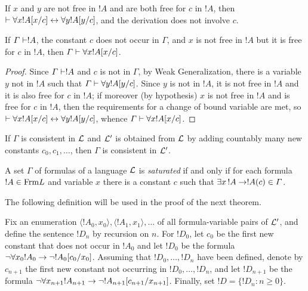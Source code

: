 \documentclass[open-logic-section]{subfiles}
\begin{document}

\begin{prop}
If $x$ and $y$ are not free in $!A$ and are both free for $c$ in $!A$,
then $\Proves \lforall[x] !A[x/c] \liff \lforall[y] !A[y/c]$, and the
derivation does not involve $c$.
\end{prop}

\begin{thm}
If $\Gamma \Proves !A$, the constant $c$ does not occur in $\Gamma$,
and $x$ is not free in $!A$ but it is free for $c$ in $!A$, then
$\Gamma \Proves \lforall[x] !A[x/c]$.
\end{thm}

\begin{proof}
Since $\Gamma \Proves !A$ and $c$ is not in $\Gamma$, by Weak
Generalization, there is a variable $y$ not in $!A$ such that $\Gamma
\Proves \lforall[y] !A [y/c]$.  Since $y$ is not in $!A$, it is not
free in $!A$ and it is also free for $c$ in $!A$; if moreover (by
hypothesis) $x$ is not free in $!A$ and is free for $c$ in $!A$, then
the requirements for a change of bound variable are met, so $\Proves
\lforall[x] !A[x/c] \liff \lforall[y] !A[y/c]$, whence $\Gamma \Proves
\lforall[x] !A[x/c]$.
\end{proof}

\begin{lem}
If $\Gamma$ is consistent in $\mathcal L$ and $\mathcal L'$ is obtained from
$\mathcal L$ by adding countably many new constants $c_0, c_1, \dots$,
then $\Gamma$ is consistent in $\mathcal L'$.
\end{lem}

\begin{defn}
  A set $\Gamma$ of formulas of a language $\mathcal {L}$ is
  \emph{saturated} if and only if for each formula $!A \in
  \Frm {L}$ and variable $x$ there is a constant $c$ such that
  $\lexists[x][!A] \lif !A(c) \in \Gamma$.
\end{defn}


The following definition will be used in the proof of the next theorem.

\begin{defn}
Fix an enumeration $\langle !A_0, x_0 \rangle, \langle !A_1, x_1
\rangle, \dots$ of all formula-variable pairs of $\mathcal L'$, and
define the sentence $!D_n$ by recursion on $n$. For $!D_0$,
let $c_0$ be the first new constant that does not occur in $!A_0$ and
let $!D_0$ be the formula $\lnot \lforall[x_0] !A_0 \lif \lnot
!A_0[c_0/x_0]$. Assuming that $!D_0, \dots, !D_n$ have been
defined, denote by $c_{n+1}$ the first new constant not occurring in
$!D_0, \dots, !D_n$, and let $!D_{n+1}$ be the formula
$\lnot \lforall[x_{n+1}] !A_{n+1} \lif \lnot
!A_{n+1}[c_{n+1}/x_{n+1}]$. Finally, set $!D = \{ !D_n : n
\geq 0 \}$.
\end{defn}
\end{document}
